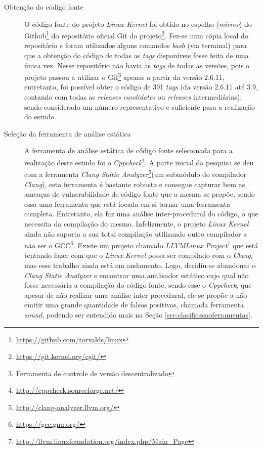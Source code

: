 \begin{description}

\item[Obtenção do código fonte]

O código fonte do projeto \textit{Linux Kernel} foi obtido no espelho
(\textit{mirror}) do Github\footnote{\url{https://github.com/torvalds/linux}}
do repositório oficial Git do
projeto\footnote{\url{https://git.kernel.org/cgit/}}.  Fez-se uma cópia local
do repositório e foram utilizados alguns comandos \textit{bash} (via terminal)
para que a obtenção do código de todas as \textit{tags} disponíveis fosse feita
de uma única vez. Nesse repositório não havia as \textit{tags} de todas as
versões, pois o projeto passou a utilizar o Git\footnote{Ferramenta de controle
de versão descentralizado} apenas a partir da versão 2.6.11, entretanto, foi
possível obter o código de 391 \textit{tags} (da versão 2.6.11 até 3.9, contando
com todas as \textit{releases candidates} ou \textit{releases} intermediárias),
sendo considerado um número representativo e suficiente para a realização do
estudo.

\item[Seleção da ferramenta de análise estática]

A ferramenta de análise estática de código fonte selecionada para a realização
deste estudo foi o
\textit{Cppcheck}\footnote{\url{http://cppcheck.sourceforge.net/}}.  A parte
inicial da pesquisa se deu com a ferramenta \textit{Clang Static
Analyzer}\footnote{\url{http://clang-analyzer.llvm.org/}}(um submódulo do
compilador \textit{Clang}), esta ferramenta é bastante robusta e consegue capturar
bem as ameaças de vulnerabilidade de código fonte que a mesma se propõe, sendo
essa uma ferramenta que está focada em si tornar uma ferramenta completa.
Entretanto, ela faz uma análise inter-procedural do código, o que necessita da
compilação do mesmo.  Infelizmente, o projeto \textit{Linux Kernel} ainda não
suporta a sua total compilação utilizando outro compilador a não ser o
GCC\footnote{\url{https://gcc.gnu.org/}}. Existe um projeto chamado
\textit{LLVMLinux
Project}\footnote{\url{http://llvm.linuxfoundation.org/index.php/Main_Page}} que
está tentando fazer com que o \textit{Linux Kernel} possa ser compilado com o
\textit{Clang}, mas esse trabalho ainda está em andamento. Logo, decidiu-se
abandonar o \textit{Clang Static Analyzer} e encontrar uma analisador estático
cujo qual não fosse necessária a compilação do código fonte, sendo esse o
\textit{Cppcheck}, que apesar de não realizar uma análise inter-procedural, ele
se propõe a não emitir uma grande quantidade de falsos positivos, chamada
ferramenta \textit{sound}, podendo ser entendido mais na Seção
\ref{sec:clasificacaoferramentas}.


\end{description}
